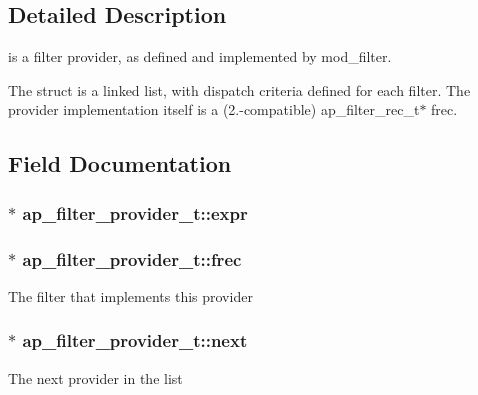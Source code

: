 \subsection{Detailed Description}
is a filter provider, as defined and implemented by mod\+\_\+filter. 

The struct is a linked list, with dispatch criteria defined for each filter. The provider implementation itself is a (2.-\/compatible) ap\+\_\+filter\+\_\+rec\+\_\+t$\ast$ frec. 

\subsection{Field Documentation}
\subsubsection[{\texorpdfstring{expr}{expr}}]{$\ast$ ap\+\_\+filter\+\_\+provider\+\_\+t\+::expr}\hypertarget{structap__filter__provider__t_a8286544693393cead60806478341a7ae}{}\label{structap__filter__provider__t_a8286544693393cead60806478341a7ae}
\subsubsection[{\texorpdfstring{frec}{frec}}]{$\ast$ ap\+\_\+filter\+\_\+provider\+\_\+t\+::frec}\hypertarget{structap__filter__provider__t_a979fdd2b4e8e7666e331281ed15dcb76}{}\label{structap__filter__provider__t_a979fdd2b4e8e7666e331281ed15dcb76}
The filter that implements this provider 
\subsubsection[{\texorpdfstring{next}{next}}]{$\ast$ ap\+\_\+filter\+\_\+provider\+\_\+t\+::next}\hypertarget{structap__filter__provider__t_a2f312ea87aef10c12cabef6f9f8e77ee}{}\label{structap__filter__provider__t_a2f312ea87aef10c12cabef6f9f8e77ee}
The next provider in the list 

